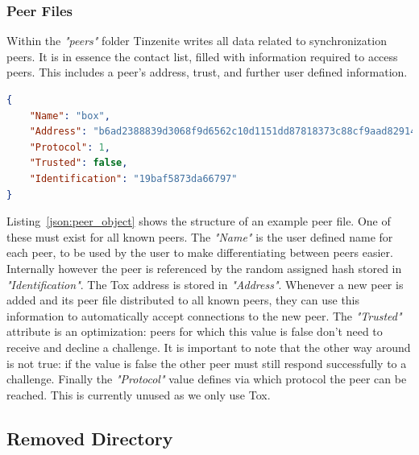 \subsubsection{Peer Files}
\label{subs:Peer Files}

Within the \textit{"peers"} folder Tinzenite writes all data related to synchronization peers.
It is in essence the contact list, filled with information required to access peers.
This includes a peer's address, trust, and further user defined information.

\begin{listing}[htp]
    \begin{lstlisting}[language=json,firstnumber=0]
{
    "Name": "box",
    "Address": "b6ad2388839d3068f9d6562c10d1151dd87818373c88cf9aad829144c63aac36",
    "Protocol": 1,
    "Trusted": false,
    "Identification": "19baf5873da66797"
}
    \end{lstlisting}
\caption[Peer JSON Object]{An example of a peer JSON object. Note that the encryption attribute is not to be trusted, it is only an optimization.}
\label{json:peer_object}
\end{listing}

Listing~\ref{json:peer_object} shows the structure of an example peer file.
One of these must exist for all known peers.
The \textit{"Name"} is the user defined name for each peer, to be used by the user to make differentiating between peers easier.
Internally however the peer is referenced by the random assigned hash stored in \textit{"Identification"}.
The Tox address is stored in \textit{"Address"}.
Whenever a new peer is added and its peer file distributed to all known peers, they can use this information to automatically accept connections to the new peer.
The \textit{"Trusted"} attribute is an optimization: peers for which this value is false don't need to receive and decline a challenge.
It is important to note that the other way around is not true: if the value is false the other peer must still respond successfully to a challenge.
Finally the \textit{"Protocol"} value defines via which protocol the peer can be reached.
This is currently unused as we only use Tox.

\subsection{Removed Directory}
\label{sub:Removed Directory}

